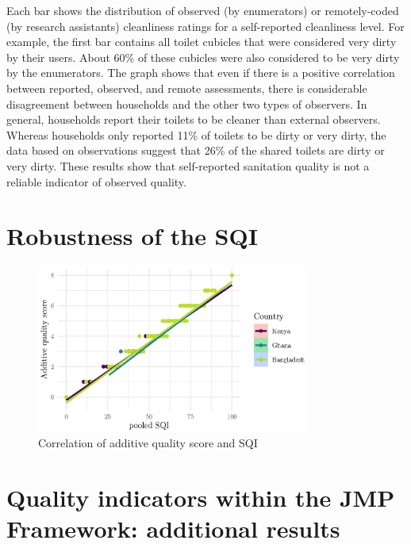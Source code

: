 \documentclass[natbib]{svjour3}                     %
\begin{document}
Each bar shows the distribution of observed (by enumerators) or remotely-coded (by research assistants) cleanliness ratings for a self-reported cleanliness level. For example, the first bar contains all toilet cubicles that were considered very dirty by their users. About 60\% of these cubicles were also considered to be very dirty by the enumerators. The graph shows that even if there is a positive correlation between reported, observed, and remote assessments, there is considerable disagreement between households and the other two types of observers. In general, households report their toilets to be cleaner than external observers. Whereas households only reported 11\% of toilets to be dirty or very dirty, the data based on observations suggest that 26\% of the shared toilets are dirty or very dirty. These results show that self-reported sanitation quality is not a reliable indicator of observed quality.


\section{Robustness of the SQI}
\label{sec:robustness}
\begin{figure}[ht]
    \centering
    \includegraphics[width=0.8\textwidth]{figures/cor_additive.eps}
    \caption{Correlation of additive quality score and SQI}
    \label{fig:corr_additive}
\end{figure}


\FloatBarrier

\section{Quality indicators within the JMP Framework: additional results}
\label{sec:newlevelsapp}

\end{document}
